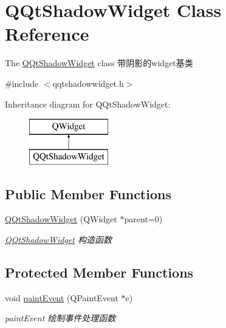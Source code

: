 \hypertarget{class_q_qt_shadow_widget}{}\section{Q\+Qt\+Shadow\+Widget Class Reference}
\label{class_q_qt_shadow_widget}


The \mbox{\hyperlink{class_q_qt_shadow_widget}{Q\+Qt\+Shadow\+Widget}} class 带阴影的widget基类  




{\ttfamily \#include $<$qqtshadowwidget.\+h$>$}

Inheritance diagram for Q\+Qt\+Shadow\+Widget\+:\begin{figure}[H]
\begin{center}
\leavevmode
\includegraphics[height=2.000000cm]{class_q_qt_shadow_widget}
\end{center}
\end{figure}
\subsection*{Public Member Functions}
\begin{DoxyCompactItemize}
\item 
\mbox{\hyperlink{class_q_qt_shadow_widget_a5cbf4811b45072217ce88a1bd3b4c825}{Q\+Qt\+Shadow\+Widget}} (Q\+Widget $\ast$parent=0)
\begin{DoxyCompactList}\small\item\em \mbox{\hyperlink{class_q_qt_shadow_widget}{Q\+Qt\+Shadow\+Widget}} 构造函数 \end{DoxyCompactList}\end{DoxyCompactItemize}
\subsection*{Protected Member Functions}
\begin{DoxyCompactItemize}
\item 
void \mbox{\hyperlink{class_q_qt_shadow_widget_a92ef80fecafaff500b60b31a0d9ca460}{paint\+Event}} (Q\+Paint\+Event $\ast$e)
\begin{DoxyCompactList}\small\item\em paint\+Event 绘制事件处理函数 \end{DoxyCompactList}\end{DoxyCompactItemize}



